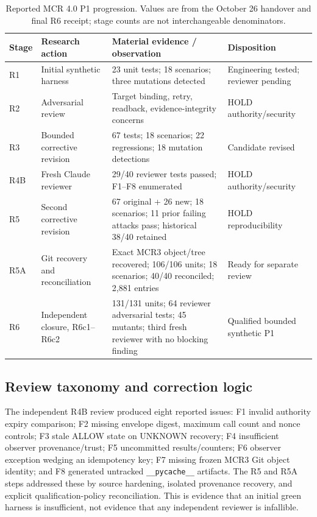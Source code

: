 \documentclass[11pt,twocolumn]{article}
\newcommand{\code}[1]{\texttt{#1}}
\begin{document}
\begin{table}[t]
\centering\caption{Reported MCR 4.0 P1 progression. Values are from the October 26 handover and final R6 receipt; stage counts are not interchangeable denominators.}
\label{tab:history}
\footnotesize
\begin{tabularx}{\textwidth}{@{}p{}p{}p{}X@{}}
\toprule
\textbf{Stage} & \textbf{Research action} & \textbf{Material evidence / observation} & \textbf{Disposition}\\\midrule
R1 & Initial synthetic harness & 23 unit tests; 18 scenarios; three mutations detected & Engineering tested; reviewer pending\\
R2 & Adversarial review & Target binding, retry, readback, evidence-integrity concerns & HOLD authority/security\\
R3 & Bounded corrective revision & 67 tests; 18 scenarios; 22 regressions; 18 mutation detections & Candidate revised\\
R4B & Fresh Claude reviewer & 29/40 reviewer tests passed; F1--F8 enumerated & HOLD authority/security\\
R5 & Second corrective revision & 67 original + 26 new; 18 scenarios; 11 prior failing attacks pass; historical 38/40 retained & HOLD reproducibility\\
R5A & Git recovery and reconciliation & Exact MCR3 object/tree recovered; 106/106 units; 18 scenarios; 40/40 reconciled; 2,881 entries & Ready for separate review\\
R6 & Independent closure, R6c1--R6c2 & 131/131 units; 64 reviewer adversarial tests; 45 mutants; third fresh reviewer with no blocking finding & Qualified bounded synthetic P1\\\bottomrule
\end{tabularx}
\end{table}

\subsection{Review taxonomy and correction logic}
The independent R4B review produced eight reported issues: F1 invalid authority expiry comparison; F2 missing envelope digest, maximum call count and nonce controls; F3 stale ALLOW state on UNKNOWN recovery; F4 insufficient observer provenance/trust; F5 uncommitted results/counters; F6 observer exception wedging an idempotency key; F7 missing frozen MCR3 Git object identity; and F8 generated untracked \code{\_\allowbreak \_\allowbreak pycache\_\allowbreak \_\allowbreak } artifacts. The R5 and R5A steps addressed these by source hardening, isolated provenance recovery, and explicit qualification-policy reconciliation. This is evidence that an initial green harness is insufficient, not evidence that any independent reviewer is infallible.
\end{document}
